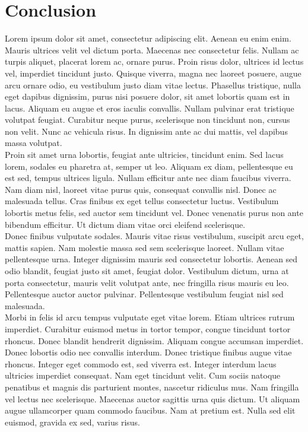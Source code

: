 \chapter{Conclusion}
\label{chap:II-7-conclusion}

Lorem ipsum dolor sit amet, consectetur adipiscing elit. Aenean eu enim enim. Mauris ultrices velit vel dictum porta. Maecenas nec consectetur felis. Nullam ac turpis aliquet, placerat lorem ac, ornare purus. Proin risus dolor, ultrices id lectus vel, imperdiet tincidunt justo. Quisque viverra, magna nec laoreet posuere, augue arcu ornare odio, eu vestibulum justo diam vitae lectus. Phasellus tristique, nulla eget dapibus dignissim, purus nisi posuere dolor, sit amet lobortis quam est in lacus. Aliquam eu augue et eros iaculis convallis. Nullam pulvinar erat tristique volutpat feugiat. Curabitur neque purus, scelerisque non tincidunt non, cursus non velit. Nunc ac vehicula risus. In dignissim ante ac dui mattis, vel dapibus massa volutpat. \\

Proin sit amet urna lobortis, feugiat ante ultricies, tincidunt enim. Sed lacus lorem, sodales eu pharetra at, semper ut leo. Aliquam ex diam, pellentesque eu est sed, tempus ultrices ligula. Nullam efficitur ante nec diam faucibus viverra. Nam diam nisl, laoreet vitae purus quis, consequat convallis nisl. Donec ac malesuada tellus. Cras finibus ex eget tellus consectetur luctus. Vestibulum lobortis metus felis, sed auctor sem tincidunt vel. Donec venenatis purus non ante bibendum efficitur. Ut dictum diam vitae orci eleifend scelerisque. \\

Donec finibus vulputate sodales. Mauris vitae risus vestibulum, suscipit arcu eget, mattis sapien. Nam molestie massa sed sem scelerisque laoreet. Nullam vitae pellentesque urna. Integer dignissim mauris sed consectetur lobortis. Aenean sed odio blandit, feugiat justo sit amet, feugiat dolor. Vestibulum dictum, urna at porta consectetur, mauris velit volutpat ante, nec fringilla risus mauris eu leo. Pellentesque auctor auctor pulvinar. Pellentesque vestibulum feugiat nisl sed malesuada. \\

Morbi in felis id arcu tempus vulputate eget vitae lorem. Etiam ultrices rutrum imperdiet. Curabitur euismod metus in tortor tempor, congue tincidunt tortor rhoncus. Donec blandit hendrerit dignissim. Aliquam congue accumsan imperdiet. Donec lobortis odio nec convallis interdum. Donec tristique finibus augue vitae rhoncus. Integer eget commodo est, sed viverra est. Integer interdum lacus ultricies imperdiet consequat. Nam eget tincidunt velit. Cum sociis natoque penatibus et magnis dis parturient montes, nascetur ridiculus mus. Nam fringilla vel lectus nec scelerisque. Maecenas auctor sagittis urna quis dictum. Ut aliquam augue ullamcorper quam commodo faucibus. Nam at pretium est. Nulla sed elit euismod, gravida ex sed, varius risus. \\

